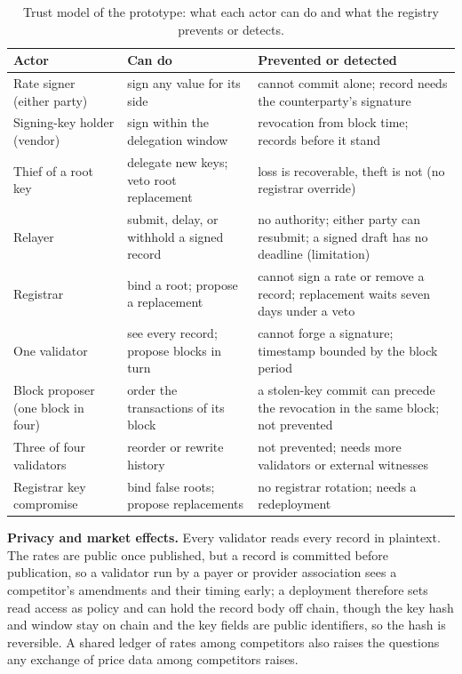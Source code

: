 \documentclass[10pt]{article}
\begin{document}
\begin{table}[!htb]
\centering
\caption{Trust model of the prototype: what each actor can do and what the registry prevents or detects.}
\scriptsize
\setlength{\tabcolsep}{3pt}
\begin{tabular}{lp{5.4cm}p{9.0cm}}
\toprule
Actor & Can do & Prevented or detected \\
\midrule
Rate signer (either party) & sign any value for its side & cannot commit alone; record needs the counterparty's signature \\
Signing-key holder (vendor) & sign within the delegation window & revocation from block time; records before it stand \\
Thief of a root key & delegate new keys; veto root replacement & loss is recoverable, theft is not (no registrar override) \\
Relayer & submit, delay, or withhold a signed record & no authority; either party can resubmit; a signed draft has no deadline (limitation) \\
Registrar & bind a root; propose a replacement & cannot sign a rate or remove a record; replacement waits seven days under a veto \\
One validator & see every record; propose blocks in turn & cannot forge a signature; timestamp bounded by the block period \\
Block proposer (one block in four) & order the transactions of its block & a stolen-key commit can precede the revocation in the same block; not prevented \\
Three of four validators & reorder or rewrite history & not prevented; needs more validators or external witnesses \\
Registrar key compromise & bind false roots; propose replacements & no registrar rotation; needs a redeployment \\
\bottomrule
\end{tabular}
\end{table}

\textbf{Privacy and market effects.} Every validator reads every record in plaintext. The rates are public once published, but a record is committed before publication, so a validator run by a payer or provider association sees a competitor's amendments and their timing early; a deployment therefore sets read access as policy and can hold the record body off chain, though the key hash and window stay on chain and the key fields are public identifiers, so the hash is reversible. A shared ledger of rates among competitors also raises the questions any exchange of price data among competitors raises.
\end{document}
